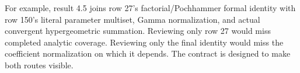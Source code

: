 For example, result 4.5 joins row 27's factorial/Pochhammer formal identity with row 150's literal parameter multiset, Gamma normalization, and actual convergent hypergeometric summation. Reviewing only row 27 would miss completed analytic coverage. Reviewing only the final identity would miss the coefficient normalization on which it depends. The contract is designed to make both routes visible.

